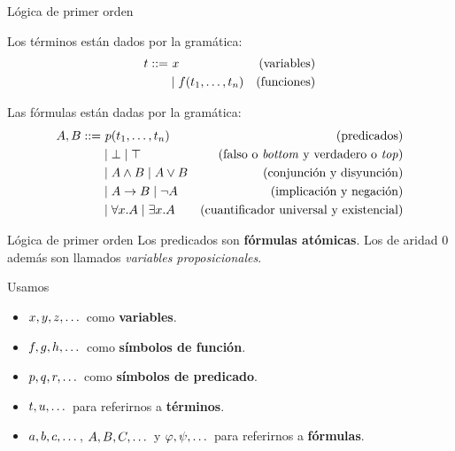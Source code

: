 \documentclass[xcolor={dvipsnames},spanish]{beamer}
\begin{document}
\begin{frame}{Lógica de primer orden}

\begin{definition}[Términos]
    Los términos están dados por la gramática:
    \begin{align*}
        \term ::= &\ \var                               &\text{(variables)} \\
                  & \mid \fun(\term_1, \dots, \term_n) &\text{(funciones)}
    \end{align*}
\end{definition}
\begin{definition}[Fórmulas]
    Las fórmulas están dadas por la gramática:
    \begin{align*}
        A, B ::=
         & \ p(t_1, \dots, t_n) & (\text{predicados})                \\
         & \mid \bot                     
           \mid \top                      & \text{(falso o \textit{bottom} y verdadero o \textit{top})} \\
         & \mid A \wedge B                        
           \mid A \vee B           & \text{(conjunción y disyunción)}     \\
         & \mid A \to B                       
           \mid \neg A                 & \text{(implicación y negación)}                  \\
         & \mid \forall x . A        
           \mid \exists x . A        & \text{(cuantificador universal y existencial)}
    \end{align*}
\end{definition}

\end{frame}

\begin{frame}{Lógica de primer orden}
Los predicados son \textbf{fórmulas atómicas}. Los de aridad 0 además son llamados \textit{variables proposicionales}.

\begin{notation*}
    Usamos
    \begin{itemize}
        \item $x, y, z, \dots$ como \textbf{variables}.
        \item $f, g, h, \dots$ como \textbf{símbolos de función}.
        \item $p, q, r, \dots$ como \textbf{símbolos de predicado}.
        \item $t, u, \dots$ para referirnos a \textbf{términos}.
        \item $a, b, c, \dots$, $A, B, C, \dots$ y $\varphi, \psi, \dots$ para referirnos a \textbf{fórmulas}.
    \end{itemize}
\end{notation*}
\end{frame}
\end{document}
